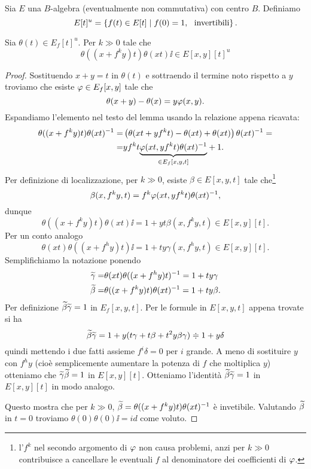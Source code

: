 \begin{notation}
Sia $E$ una $B$-algebra (eventualmente non commutativa) con centro $B$. Definiamo
\[E[t]^u=\left\{{f(t)\in E[t]\mid f(0)=1,\ \text{ invertibili}}\right\}.\]
\end{notation}

\begin{lemma}[]\label{LmTecnicoSuPolinomiACoeffInAlgebre}
Sia $\theta(t)\in E_f[t]^u$. Per $k\gg 0$ tale che
\[\theta((x+f^ky)t)\theta(xt)\ii\in E[x,y][t]^u\]
\end{lemma}
\begin{proof}
Sostituendo $x+y=t$ in $\theta(t)$ e sottraendo il termine noto rispetto a $y$ troviamo che esiste $\varphi\in E_f[x,y]$ tale che 
\[\theta(x+y)-\theta(x)=y\varphi(x,y).\]
Espandiamo l'elemento nel testo del lemma usando la relazione appena ricavata:
\begin{align*}
	\theta((x+f^ky)t)\theta(xt)^{-1}=&\left({\theta(xt+yf^kt)-\theta(xt)+\theta(xt)}\right)\theta(xt)^{-1}=\\
	=&yf^kt\underset{\in E_f[x,y,t]}{\underbrace{\varphi(xt,yf^kt)\theta(xt)^{-1}}}+1.
\end{align*}
Per definizione di localizzazione, per $k\gg0$, esiste $\beta\in E[x,y,t]$ tale che\footnote{l'$f^k$ nel secondo argomento di $\varphi$ non causa problemi, anzi per $k\gg 0$ contribuisce a cancellare le eventuali $f$ al denominatore dei coefficienti di $\varphi$.}
\[\beta(x,f^ky,t)=f^k\varphi(xt,yf^kt)\theta(xt)^{-1},\]
dunque
\[\theta((x+f^ky)t)\theta(xt)\ii=1+yt\beta(x,f^ky,t)\in E[x,y][t].\]
Per un conto analogo
\[\theta(xt)\theta((x+f^hy)t)\ii=1+ty\gamma(x,f^hy,t)\in E[x,y][t].\]
Semplifichiamo la notazione ponendo
\begin{align*}
	\widetilde{\gamma}=&\theta(xt)\theta((x+f^hy)t)^{-1}=1+ty\gamma\\
	\widetilde{\beta}=&\theta((x+f^ky)t)\theta(xt)^{-1}=1+ty\beta.
\end{align*}
Per definizione $\widetilde{\beta}\widetilde{\gamma}=1$ in $E_f[x,y,t]$. Per le formule in $E[x,y,t]$ appena trovate si ha 
\[\widetilde{\beta}\widetilde{\gamma}=1+y(t\gamma+t\beta+t^2y\beta\gamma)\doteqdot1+y\delta\]
quindi mettendo i due fatti assieme $f^i\delta=0$ per $i$ grande. A meno di sostituire $y$ con $f^hy$ (cio\`e semplicemente aumentare la potenza di $f$ che moltiplica $y$) otteniamo che $\widetilde{\gamma}\widetilde{\beta}=1$ in $E[x,y][t]$. Otteniamo l'identit\`a $\widetilde{\beta}\widetilde{\gamma}=1$ in $E[x,y][t]$ in modo analogo.

Questo mostra che per $k\gg0$, $\widetilde{\beta}=\theta((x+f^ky)t)\theta(xt)^{-1}$ \`e invetibile. Valutando $\widetilde{\beta}$ in $t=0$ troviamo $\theta(0)\theta(0)\ii=id$ come voluto.
\end{proof}


